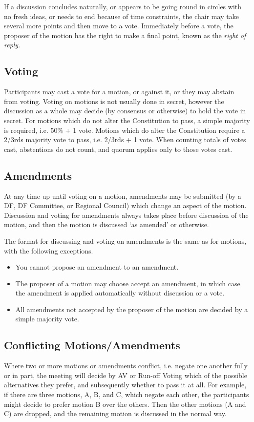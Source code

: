 \documentclass[a4paper, 12pt]{article} %
\begin{document}
If a discussion concludes naturally, or appears to be going round in circles with no fresh ideas, or needs to end because of time constraints, the chair may take several more points and then move to a vote.  Immediately before a vote, the proposer of the motion has the right to make a final point, known as the \emph{right of reply}.

\subsection{Voting}
\label{sec:motionvoting}
Participants may cast a vote for a motion, or against it, or they may abstain from voting.  Voting on motions is not usually done in secret, however the discussion as a whole may decide (by consensus or otherwise) to hold the vote in secret.  For motions which do not alter the Constitution to pass, a simple majority is required, i.e. 50\% + 1 vote.  Motions which do alter the Constitution require a 2/3rds majority vote to pass, i.e. 2/3rds + 1 vote.  When counting totals of votes cast, abstentions do not count, and quorum applies only to those votes cast.

\subsection{Amendments}
At any time up until voting on a motion, amendments may be submitted (by a DF, DF Committee, or Regional Council) which change an aspect of the motion.  Discussion and voting for amendments always takes place before discussion of the motion, and then the motion is discussed `as amended' or otherwise.

The format for discussing and voting on amendments is the same as for motions, with the following exceptions.
\begin{itemize}
\item You cannot propose an amendment to an amendment.
\item The proposer of a motion may choose accept an amendment, in which case the amendment is applied automatically without discussion or a vote.
\item All amendments not accepted by the proposer of the motion are decided by a simple majority vote.
\end{itemize}

\subsection{Conflicting Motions/Amendments}
\label{sec:conflicting}
Where two or more motions or amendments conflict, i.e. negate one another fully or in part, the meeting will decide by AV or Run-off Voting which of the possible alternatives they prefer, and subsequently whether to pass it at all.  For example, if there are three motions, A, B, and C, which negate each other, the participants might decide to prefer motion B over the others.  Then the other motions (A and C) are dropped, and the remaining motion is discussed in the normal way.
\end{document}
